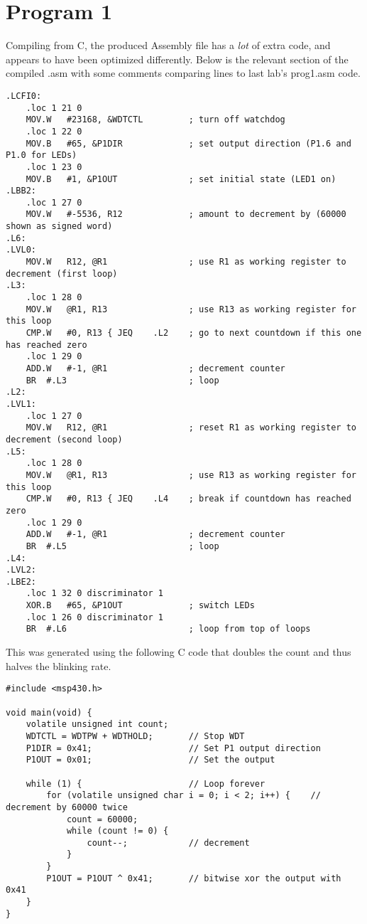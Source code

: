 \documentclass[letterpaper]{article}
\begin{document}
	\section{Program 1}
		Compiling from C, the produced Assembly file has a \textit{lot} of extra code, and appears to have been optimized differently. Below is the relevant section of the compiled .asm with some comments comparing lines to last lab's prog1.asm code.
		\begin{verbatim}
.LCFI0:
	.loc 1 21 0
	MOV.W   #23168, &WDTCTL         ; turn off watchdog
	.loc 1 22 0
	MOV.B   #65, &P1DIR             ; set output direction (P1.6 and P1.0 for LEDs)
	.loc 1 23 0
	MOV.B   #1, &P1OUT              ; set initial state (LED1 on)
.LBB2:
	.loc 1 27 0
	MOV.W   #-5536, R12             ; amount to decrement by (60000 shown as signed word)
.L6:
.LVL0:
	MOV.W   R12, @R1                ; use R1 as working register to decrement (first loop)
.L3:
	.loc 1 28 0
	MOV.W   @R1, R13                ; use R13 as working register for this loop
	CMP.W   #0, R13 { JEQ    .L2    ; go to next countdown if this one has reached zero
	.loc 1 29 0
	ADD.W   #-1, @R1                ; decrement counter
	BR  #.L3                        ; loop
.L2:
.LVL1:
	.loc 1 27 0
	MOV.W   R12, @R1                ; reset R1 as working register to decrement (second loop)
.L5:
	.loc 1 28 0
	MOV.W   @R1, R13                ; use R13 as working register for this loop
	CMP.W   #0, R13 { JEQ    .L4    ; break if countdown has reached zero
	.loc 1 29 0
	ADD.W   #-1, @R1                ; decrement counter
	BR  #.L5                        ; loop
.L4:
.LVL2:
.LBE2:
	.loc 1 32 0 discriminator 1
	XOR.B   #65, &P1OUT             ; switch LEDs
	.loc 1 26 0 discriminator 1
	BR  #.L6                        ; loop from top of loops
		\end{verbatim}
		\newpage
		This was generated using the following C code that doubles the count and thus halves the blinking rate. 
		\begin{verbatim}
#include <msp430.h>

void main(void) {
    volatile unsigned int count;
    WDTCTL = WDTPW + WDTHOLD;       // Stop WDT
    P1DIR = 0x41;                   // Set P1 output direction
    P1OUT = 0x01;                   // Set the output
    
    while (1) {                     // Loop forever
        for (volatile unsigned char i = 0; i < 2; i++) {    // decrement by 60000 twice
            count = 60000;
            while (count != 0) {
                count--;            // decrement
            }
        }
        P1OUT = P1OUT ^ 0x41;       // bitwise xor the output with 0x41
    }
}
		\end{verbatim}
	
\end{document}
